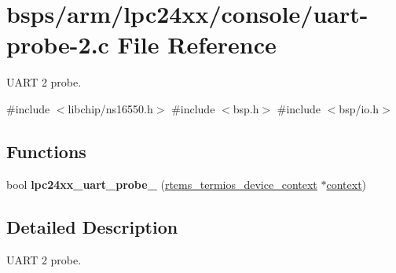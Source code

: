 \hypertarget{uart-probe-2_8c}{}\section{bsps/arm/lpc24xx/console/uart-\/probe-\/2.c File Reference}
\label{uart-probe-2_8c}


U\+A\+RT 2 probe.  


{\ttfamily \#include $<$libchip/ns16550.\+h$>$}\newline
{\ttfamily \#include $<$bsp.\+h$>$}\newline
{\ttfamily \#include $<$bsp/io.\+h$>$}\newline
\subsection*{Functions}
\begin{DoxyCompactItemize}
\item 
bool {\bfseries lpc24xx\+\_\+uart\+\_\+probe\+\_} (\mbox{\hyperlink{structrtems__termios__device__context}{rtems\+\_\+termios\+\_\+device\+\_\+context}} $\ast$\mbox{\hyperlink{sun4u_2tte_8h_a9b4a99475e2709333b8e5d70483173f1}{context}})
\end{DoxyCompactItemize}


\subsection{Detailed Description}
U\+A\+RT 2 probe. 


